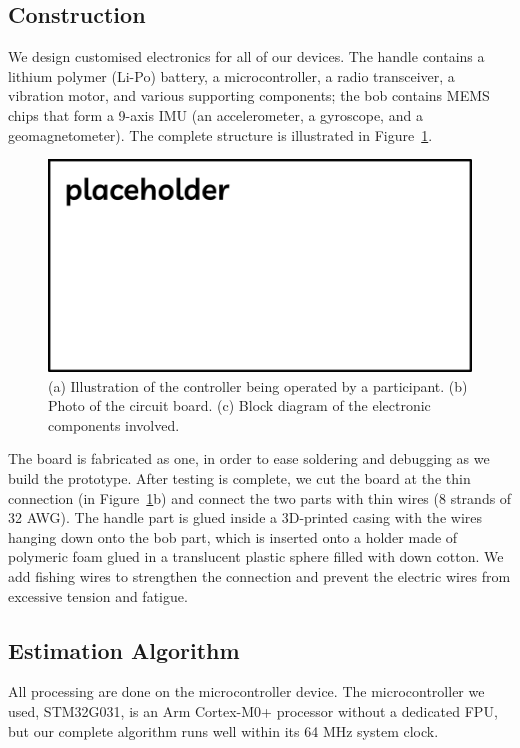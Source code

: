 \documentclass{nime-alternate} %
\begin{document}
\subsection{Construction}
We design customised electronics for all of our devices. The handle contains a lithium polymer (Li-Po) battery, a microcontroller, a radio transceiver, a vibration motor, and various supporting components; the bob contains MEMS chips that form a 9-axis IMU (an accelerometer, a gyroscope, and a geomagnetometer). The complete structure is illustrated in Figure~\ref{fig:WandConstruction}.

\begin{figure}[h!]
  \centering
  \includegraphics[width=1\textwidth]{placeholder.png}
  \caption{(a) Illustration of the controller being operated by a participant. (b) Photo of the circuit board. (c) Block diagram of the electronic components involved.}
  \label{fig:WandConstruction}
\end{figure}

The board is fabricated as one, in order to ease soldering and debugging as we build the prototype. After testing is complete, we cut the board at the thin connection (in Figure~\ref{fig:WandConstruction}b) and connect the two parts with thin wires (8 strands of 32 AWG). The handle part is glued inside a 3D-printed casing with the wires hanging down onto the bob part, which is inserted onto a holder made of polymeric foam glued in a translucent plastic sphere filled with down cotton. We add fishing wires to strengthen the connection and prevent the electric wires from excessive tension and fatigue.

\subsection{Estimation Algorithm}
All processing are done on the microcontroller device. The microcontroller we used, STM32G031, is an Arm Cortex-M0+ processor without a dedicated FPU, but our complete algorithm runs well within its 64 MHz system clock.
\end{document}
